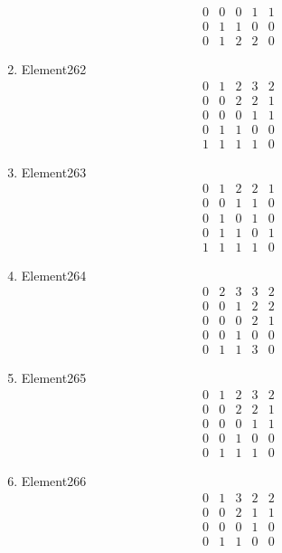 \documentclass[12pt]{article}
\begin{document}
\begin{multicols}{3}
\begin{enumerate}
\begin{equation*}
\begin{array}{ccccc}
0&0&0&1&1\\
0&1&1&0&0\\
0&1&2&2&0
\end{array}
\end{equation*}
\item Element262
\begin{equation*}
\begin{array}{ccccc}
0&1&2&3&2\\
0&0&2&2&1\\
0&0&0&1&1\\
0&1&1&0&0\\
1&1&1&1&0
\end{array}
\end{equation*}
\item Element263
\begin{equation*}
\begin{array}{ccccc}
0&1&2&2&1\\
0&0&1&1&0\\
0&1&0&1&0\\
0&1&1&0&1\\
1&1&1&1&0
\end{array}
\end{equation*}
\item Element264
\begin{equation*}
\begin{array}{ccccc}
0&2&3&3&2\\
0&0&1&2&2\\
0&0&0&2&1\\
0&0&1&0&0\\
0&1&1&3&0
\end{array}
\end{equation*}
\item Element265
\begin{equation*}
\begin{array}{ccccc}
0&1&2&3&2\\
0&0&2&2&1\\
0&0&0&1&1\\
0&0&1&0&0\\
0&1&1&1&0
\end{array}
\end{equation*}
\item Element266
\begin{equation*}
\begin{array}{ccccc}
0&1&3&2&2\\
0&0&2&1&1\\
0&0&0&1&0\\
0&1&1&0&0\\

\end{array}
\end{equation*}
\end{enumerate}
\end{multicols}
\end{document}
